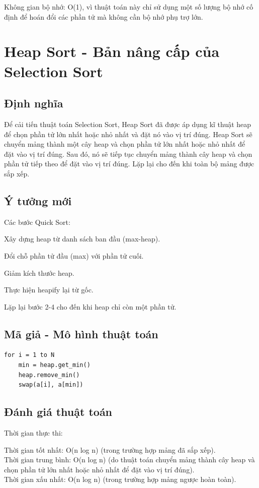 \documentclass[12pt,a4paper]{report}
\begin{document}
{Không gian bộ nhớ: O(1), vì thuật toán này chỉ sử dụng một số lượng bộ nhớ cố định để hoán đổi các phần tử mà không cần bộ nhớ phụ trợ lớn.}

\section{ Heap Sort - Bản nâng cấp của Selection Sort}
 
\subsection{ Định nghĩa}

{\large \hspace{1cm} Để cải tiến thuật toán Selection Sort, Heap Sort đã được áp dụng kĩ thuật heap để chọn phần tử lớn nhất hoặc nhỏ nhất và đặt nó vào vị trí đúng. Heap Sort sẽ chuyển mảng thành một cây heap và chọn phần tử lớn nhất hoặc nhỏ nhất để đặt vào vị trí đúng. Sau đó, nó sẽ tiếp tục chuyển mảng thành cây heap và chọn phần tử tiếp theo để đặt vào vị trí đúng. Lặp lại cho đến khi toàn bộ mảng được sắp xếp.}

\subsection {Ý tưởng mới}

Các bước Quick Sort:

Xây dựng heap từ danh sách ban đầu (max-heap).

Đổi chỗ phần tử đầu (max) với phần tử cuối.

Giảm kích thước heap.

Thực hiện heapify lại từ gốc.

Lặp lại bước 2-4 cho đến khi heap chỉ còn một phần tử.

\subsection{ Mã giả - Mô hình thuật toán}

\begin{lstlisting}
for i = 1 to N
    min = heap.get_min()
    heap.remove_min()
    swap(a[i], a[min])
\end{lstlisting}

\subsection{ Đánh giá thuật toán}

{Thời gian thực thi:

\hspace{0.5cm} Thời gian tốt nhất: O(n log n) (trong trường hợp mảng đã sắp xếp).\\

\hspace{0.5cm} Thời gian trung bình: O(n log n) (do thuật toán chuyển mảng thành cây heap và chọn phần tử lớn nhất hoặc nhỏ nhất để đặt vào vị trí đúng).\\

\hspace{0.5cm} Thời gian xấu nhất: O(n log n) (trong trường hợp mảng ngược hoàn toàn).\\}
\end{document}
